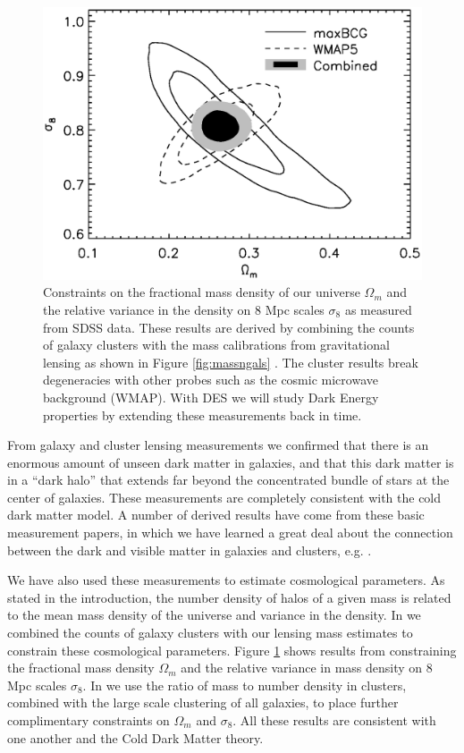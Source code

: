 \documentclass[12pt]{article}
\begin{document}
\begin{figure}[p] 
\centering 
\includegraphics[scale=0.6]{s8_Om.ps}

\caption{Constraints on the fractional mass density of our universe $\Omega_m$
and the relative variance in the density on 8 Mpc scales $\sigma_8$ as measured
from SDSS data.  These results \cite{RozoCosmo09} are derived by combining the
counts of galaxy clusters with the mass calibrations from gravitational lensing
as shown in Figure \ref{fig:massngals}
\cite{SheldonLensing07,JohnstonLensing07}.  The cluster results break
degeneracies with other probes such as the cosmic microwave background (WMAP).
With DES we will study Dark Energy properties by extending these measurements
back in time.  \label{fig:omegasigma8}} \end{figure}



From galaxy and cluster lensing measurements we confirmed that there is an
enormous amount of unseen dark matter in galaxies, and that this dark matter is
in a ``dark halo'' that extends far beyond the concentrated bundle of stars at
the center of galaxies.  These measurements are completely consistent with the
cold dark matter model.  A number of derived results have come from these basic
measurement papers, in which we have learned a great deal about the connection
between the dark and visible matter in galaxies and clusters, e.g.
\cite{RykoffLXM08,RozoScatter09,TinkerM2N2012}. 

We have also used these measurements to estimate cosmological parameters.  As
stated in the introduction, the number density of halos of a given mass is
related to the mean mass density of the universe and variance in the density.
In \cite{RozoCosmo09} we combined the counts of galaxy clusters with our
lensing mass estimates to constrain these cosmological parameters.  Figure
\ref{fig:omegasigma8} shows results from \cite{RozoCosmo09} constraining the
fractional mass density $\Omega_m$ and the relative variance in mass density on
8 Mpc scales $\sigma_8$.  In \cite{TinkerM2N2012} we use the ratio of mass to
number density in clusters, combined with the large scale clustering of all
galaxies, to place further complimentary constraints on $\Omega_m$ and
$\sigma_8$.  All these results are consistent with one another and the Cold
Dark Matter theory.
\end{document}
